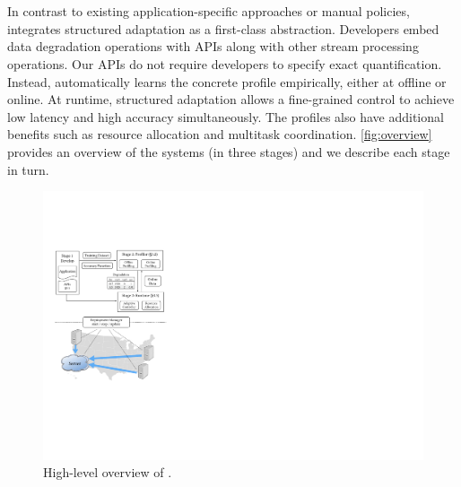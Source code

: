 \section{\sysname{}}
\label{sec:system}

In contrast to existing application-specific approaches or manual policies,
\sysname{} integrates structured adaptation as a first-class
abstraction. Developers embed data degradation operations with \maybe{} APIs
along with other stream processing operations. Our APIs do not require
developers to specify exact quantification. Instead, \sysname{} automatically
learns the concrete profile empirically, either at offline or online. At
runtime, structured adaptation allows a fine-grained control to achieve low
latency and high accuracy simultaneously. The profiles also have additional
benefits such as resource allocation and multitask
coordination. \autoref{fig:overview} provides an overview of the systems (in
three stages) and we describe each stage in turn.

\begin{figure}
  \centering
  \includegraphics[width=.9\linewidth]{figures/system.pdf}
  \caption{High-level overview of \sysname{}.}
  \label{fig:overview}
\end{figure}





